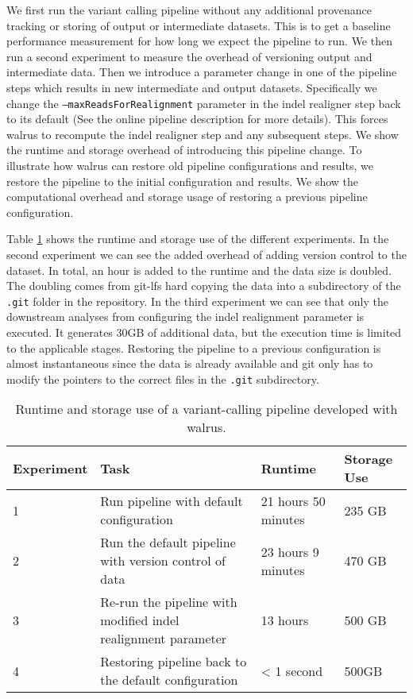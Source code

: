 We first run the variant calling pipeline without any additional provenance
tracking or storing of output or intermediate datasets. This is to get a
baseline performance measurement for how long we expect the pipeline to run. We
then run a second experiment to measure the overhead of versioning output and
intermediate data. Then we introduce a parameter change in one of the pipeline
steps which results in new intermediate and output datasets. Specifically we
change the \texttt{--maxReadsForRealignment} parameter in the indel realigner step
back to its default (See the online pipeline description for more
details). This forces walrus to recompute the indel realigner step
and any subsequent steps. We show the runtime and storage overhead of
introducing this pipeline change. To illustrate how walrus can restore old
pipeline configurations and results, we restore the pipeline to the initial
configuration and results. We show the computational overhead and storage usage
of restoring a previous pipeline configuration. 

Table \ref{resultstable} shows the runtime and storage use of the different
experiments. In the second experiment we can see the added overhead of adding
version control to the dataset. In total, an hour is added to the runtime and
the data size is doubled. The doubling comes from git-lfs hard copying the data
into a subdirectory of the \texttt{.git} folder in the repository. In the third
experiment we can see that only the downstream analyses from configuring the
indel realignment parameter is executed. It generates 30GB of additional data,
but the execution time is limited to the applicable stages. Restoring the
pipeline to a previous configuration is almost instantaneous since the data is
already available and git only has to modify the pointers to the correct files
in the \texttt{.git} subdirectory. 

\begin{table}[ht!]
    \centering
    \caption{Runtime and storage use of a variant-calling pipeline developed with walrus.} 
    \begin{tabular}{ | l | p{5cm} | l | l |}
    \hline
    Experiment & Task & Runtime & Storage Use \\ \hline
    1 & Run pipeline with default configuration & 21 hours 50 minutes & 235 GB \\ \hline
    2 & Run the default pipeline with version control of data & 23 hours 9 minutes & 470 GB \\ \hline
    3 & Re-run the pipeline with modified indel realignment parameter & 13 hours & 500 GB \\ \hline
    4 & Restoring pipeline back to the default configuration & < 1 second & 500GB \\ \hline
    \end{tabular}
    \label{resultstable}
\end{table}


